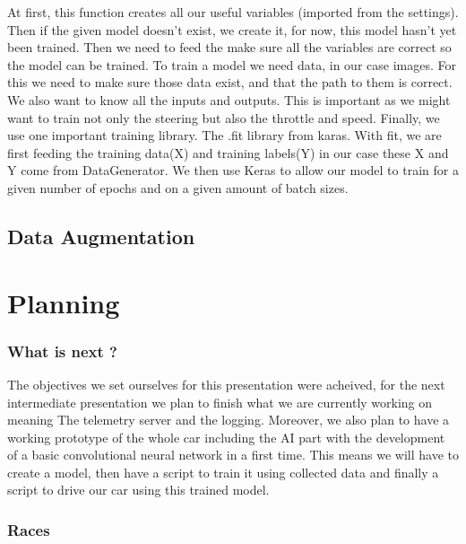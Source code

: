 \documentclass[12pt]{article}
\begin{document}
At first, this function creates all our useful variables (imported from the settings).  Then if the given model doesn’t exist, we create it, for now, this model hasn’t yet been trained.  Then we need to feed the make sure all the variables are correct so the model can be trained.  To train a model we need data, in our case images. For this we need to make sure those data exist, and that the path to them is correct.  
We also want to know all the inputs and outputs. This is important as we might want to train not only the steering but also the throttle and speed.  
Finally, we use one important training library. The .fit library from karas. With fit, we are first feeding the training data(X) and training labels(Y) in our case these X and Y come from DataGenerator. We then use Keras to allow our model to train for a given number of epochs and on a given amount of batch sizes. 

\subsection{Data Augmentation}



\newpage

\section {Planning}
\subsubsection {What is next ?}
The objectives we set ourselves for this presentation were acheived, for the next intermediate presentation we plan to finish what we are currently working on meaning The telemetry server and the logging. Moreover, we also plan to have a working prototype of the whole car including the AI part with the development of a basic convolutional neural network in a first time. This means we will have to create a model, then have a script to train it using collected data and finally a script to drive our car using this trained model.

\subsubsection {Races}
\end{document}
